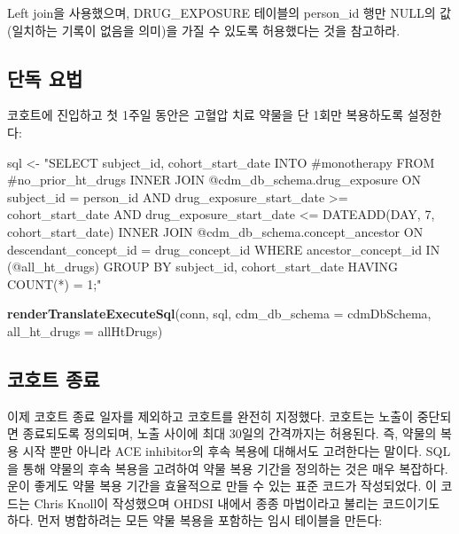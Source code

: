 \documentclass[11pt]{book}
\newenvironment{Shaded}{\begin{snugshade}}{\end{snugshade}}
\newcommand{\KeywordTok}[1]{\textcolor[rgb]{0.13,0.29,0.53}{\textbf{#1}}}
\newcommand{\DataTypeTok}[1]{\textcolor[rgb]{0.13,0.29,0.53}{#1}}
\newcommand{\StringTok}[1]{\textcolor[rgb]{0.31,0.60,0.02}{#1}}
\newcommand{\NormalTok}[1]{#1}
\theoremstyle{definition}
\theoremstyle{definition}
\theoremstyle{definition}
\theoremstyle{remark}
\begin{document}
Left join을 사용했으며, DRUG\_EXPOSURE 테이블의 person\_id 행만 NULL의
값(일치하는 기록이 없음을 의미)을 가질 수 있도록 허용했다는 것을
참고하라.

\subsection{단독 요법}\label{-}

코호트에 진입하고 첫 1주일 동안은 고혈압 치료 약물을 단 1회만 복용하도록
설정한다:

\begin{Shaded}
\begin{Highlighting}[]
\NormalTok{sql <-}\StringTok{ "SELECT subject_id,}
\StringTok{  cohort_start_date}
\StringTok{INTO #monotherapy}
\StringTok{FROM #no_prior_ht_drugs}
\StringTok{INNER JOIN @cdm_db_schema.drug_exposure}
\StringTok{  ON subject_id = person_id}
\StringTok{    AND drug_exposure_start_date >= cohort_start_date}
\StringTok{    AND drug_exposure_start_date <= DATEADD(DAY, 7, cohort_start_date)}
\StringTok{INNER JOIN @cdm_db_schema.concept_ancestor}
\StringTok{  ON descendant_concept_id = drug_concept_id}
\StringTok{WHERE ancestor_concept_id IN (@all_ht_drugs)}
\StringTok{GROUP BY subject_id,}
\StringTok{  cohort_start_date}
\StringTok{HAVING COUNT(*) = 1;"}

\KeywordTok{renderTranslateExecuteSql}\NormalTok{(conn,}
\NormalTok{                          sql,}
                          \DataTypeTok{cdm_db_schema =}\NormalTok{ cdmDbSchema,}
                          \DataTypeTok{all_ht_drugs =}\NormalTok{ allHtDrugs)}
\end{Highlighting}
\end{Shaded}

\subsection{코호트 종료}\label{-}

이제 코호트 종료 일자를 제외하고 코호트를 완전히 지정했다. 코호트는
노출이 중단되면 종료되도록 정의되며, 노출 사이에 최대 30일의 간격까지는
허용된다. 즉, 약물의 복용 시작 뿐만 아니라 ACE inhibitor의 후속 복용에
대해서도 고려한다는 말이다. SQL을 통해 약물의 후속 복용을 고려하여 약물
복용 기간을 정의하는 것은 매우 복잡하다. 운이 좋게도 약물 복용 기간을
효율적으로 만들 수 있는 표준 코드가 작성되었다. 이 코드는 Chris Knoll이
작성했으며 OHDSI 내에서 종종 마법이라고 불리는 코드이기도 하다. 먼저
병합하려는 모든 약물 복용을 포함하는 임시 테이블을 만든다:
\end{document}
